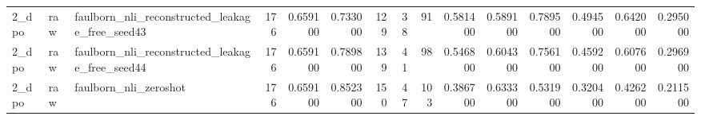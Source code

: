 \begin{tabular}{lllrrrrrrrrrrrr}
2_dpo & raw & faulborn_nli_reconstructed_leakage_free_seed43 & 176 & 0.659100 & 0.733000 & 129 & 38 & 91 & 0.581400 & 0.589100 & 0.789500 & 0.494500 & 0.642000 & 0.295000 \\
2_dpo & raw & faulborn_nli_reconstructed_leakage_free_seed44 & 176 & 0.659100 & 0.789800 & 139 & 41 & 98 & 0.546800 & 0.604300 & 0.756100 & 0.459200 & 0.607600 & 0.296900 \\
2_dpo & raw & faulborn_nli_zeroshot & 176 & 0.659100 & 0.852300 & 150 & 47 & 103 & 0.386700 & 0.633300 & 0.531900 & 0.320400 & 0.426200 & 0.211500 \\
\bottomrule
\end{tabular}
